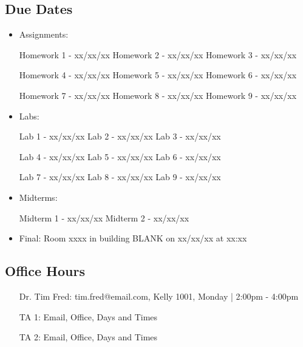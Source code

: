 \documentclass[11pt,fleqn,openany]{book} %
\begin{document}
\subsection{Due Dates}
\begin{itemize}
  \item Assignments:

    Homework 1 - xx/xx/xx  \hspace{3 mm}  Homework 2 - xx/xx/xx \hspace{3 mm} Homework 3 - xx/xx/xx

    Homework 4 - xx/xx/xx \hspace{3 mm}  Homework 5 - xx/xx/xx \hspace{3 mm} Homework 6 - xx/xx/xx 

    Homework 7 - xx/xx/xx \hspace{3 mm}  Homework 8 - xx/xx/xx \hspace{3 mm} Homework 9 - xx/xx/xx 
\\ 
  \item Labs:

    Lab 1 - xx/xx/xx  \hspace{3 mm}  Lab 2 - xx/xx/xx \hspace{3 mm} Lab 3 - xx/xx/xx

    Lab 4 - xx/xx/xx \hspace{3 mm}  Lab 5 - xx/xx/xx \hspace{3 mm} Lab 6 - xx/xx/xx 

    Lab 7 - xx/xx/xx \hspace{3 mm}  Lab 8 - xx/xx/xx \hspace{3 mm} Lab 9 - xx/xx/xx 
\\
  \item Midterms:

    Midterm 1 - xx/xx/xx \hspace{3mm} Midterm 2 - xx/xx/xx
\\
  \item Final:
    Room xxxx in building BLANK on xx/xx/xx at xx:xx 
\\
\end{itemize}

\subsection{Office Hours}
\begin{itemize}[leftmargin=1cm]
\item[Dr. Tim Fred:]  tim.fred@email.com, Kelly 1001, Monday | 2:00pm - 4:00pm 
\item[TA 1:] Email, Office, Days and Times
\item[TA 2:] Email, Office, Days and Times
\end{itemize}
\pagebreak
\end{document}
